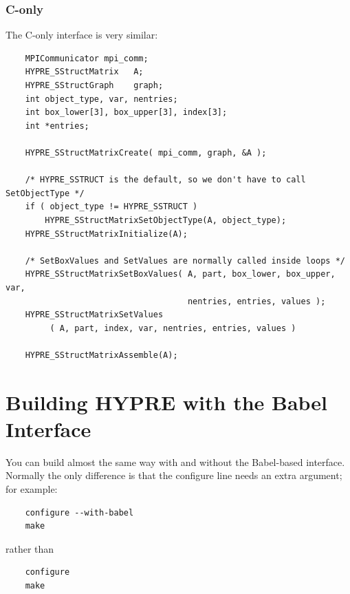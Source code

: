 \subsubsection{C-only}

The C-only interface is very similar:
\begin{verbatim}
    MPICommunicator mpi_comm;
    HYPRE_SStructMatrix   A;
    HYPRE_SStructGraph    graph;
    int object_type, var, nentries;
    int box_lower[3], box_upper[3], index[3];
    int *entries;

    HYPRE_SStructMatrixCreate( mpi_comm, graph, &A );

    /* HYPRE_SSTRUCT is the default, so we don't have to call SetObjectType */
    if ( object_type != HYPRE_SSTRUCT )
        HYPRE_SStructMatrixSetObjectType(A, object_type);
    HYPRE_SStructMatrixInitialize(A);

    /* SetBoxValues and SetValues are normally called inside loops */
    HYPRE_SStructMatrixSetBoxValues( A, part, box_lower, box_upper, var,
                                     nentries, entries, values );
    HYPRE_SStructMatrixSetValues
         ( A, part, index, var, nentries, entries, values )

    HYPRE_SStructMatrixAssemble(A);
\end{verbatim}




\section{Building HYPRE with the Babel Interface}

You can build \hypre{} almost the same way with and without the
Babel-based interface.  Normally the only difference is that the
configure line needs an extra argument; for example:

\begin{verbatim}
    configure --with-babel
    make
\end{verbatim}
rather than
\begin{verbatim}
    configure
    make
\end{verbatim}

